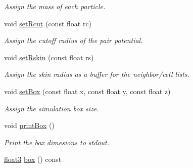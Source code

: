\begin{DoxyCompactItemize}
\begin{DoxyCompactList}\small\item\em Assign the mass of each particle. \end{DoxyCompactList}\item 
\hypertarget{classsystem_definition_aae59925e7b9019a6d67b2324b60051ec}{void \hyperlink{classsystem_definition_aae59925e7b9019a6d67b2324b60051ec}{set\-Rcut} (const float rc)}\label{classsystem_definition_aae59925e7b9019a6d67b2324b60051ec}

\begin{DoxyCompactList}\small\item\em Assign the cutoff radius of the pair potential. \end{DoxyCompactList}\item 
\hypertarget{classsystem_definition_a14d765f5f918d35662d69fb84c61ce86}{void \hyperlink{classsystem_definition_a14d765f5f918d35662d69fb84c61ce86}{set\-Rskin} (const float rs)}\label{classsystem_definition_a14d765f5f918d35662d69fb84c61ce86}

\begin{DoxyCompactList}\small\item\em Assign the skin radius as a buffer for the neighbor/cell lists. \end{DoxyCompactList}\item 
\hypertarget{classsystem_definition_a3d26cd585817637da7544ce82ae48f66}{void \hyperlink{classsystem_definition_a3d26cd585817637da7544ce82ae48f66}{set\-Box} (const float x, const float y, const float z)}\label{classsystem_definition_a3d26cd585817637da7544ce82ae48f66}

\begin{DoxyCompactList}\small\item\em Assign the simulation box size. \end{DoxyCompactList}\item 
\hypertarget{classsystem_definition_a33258dffa795227ab6022b1c1d50fc81}{void \hyperlink{classsystem_definition_a33258dffa795227ab6022b1c1d50fc81}{print\-Box} ()}\label{classsystem_definition_a33258dffa795227ab6022b1c1d50fc81}

\begin{DoxyCompactList}\small\item\em Print the box dimesions to stdout. \end{DoxyCompactList}\item 
\hypertarget{classsystem_definition_a85b80dee3609ddb68e370cee3fa959ea}{\hyperlink{structfloat3}{float3} \hyperlink{classsystem_definition_a85b80dee3609ddb68e370cee3fa959ea}{box} () const }\label{classsystem_definition_a85b80dee3609ddb68e370cee3fa959ea}


\end{DoxyCompactItemize}
